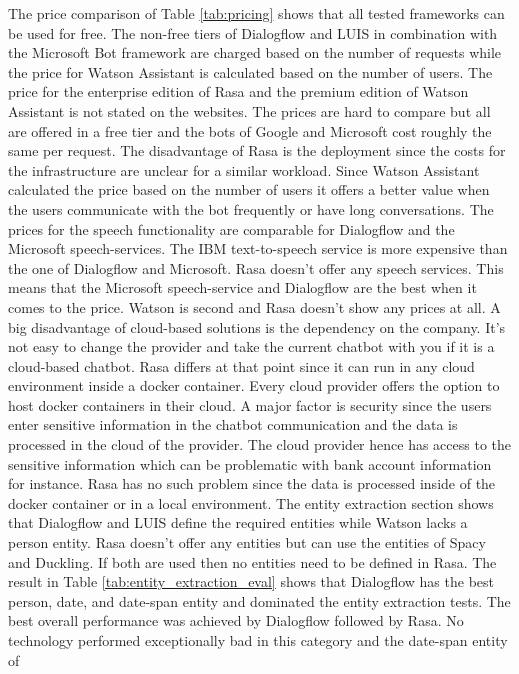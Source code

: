 The price comparison of Table \ref{tab:pricing} shows that all 
tested frameworks can be used for free.
The non-free tiers of Dialogflow and LUIS in combination with the Microsoft Bot framework 
are charged based on the number of requests while the price for Watson Assistant
is calculated based on the number of users.
The price for the enterprise edition of Rasa and the premium edition of Watson Assistant 
is not stated on the websites.
The prices are hard to compare but all are offered in a free tier and the 
bots of Google and Microsoft cost roughly the same per request. 
The disadvantage of Rasa is the deployment since the costs for the infrastructure are unclear 
for a similar workload.
Since Watson Assistant calculated the price based on the number of users it offers a better 
value when the users communicate with the bot frequently or have long conversations.
The prices for the speech functionality are comparable for Dialogflow and the Microsoft speech-services.
The IBM text-to-speech service is more expensive than the one of Dialogflow and Microsoft.
Rasa doesn't offer any speech services.
This means that the Microsoft speech-service and Dialogflow are the best when it comes to the 
price. Watson is second and Rasa doesn't show any prices at all.
A big disadvantage of cloud-based solutions is the dependency on the company.
It's not easy to change the provider and take the current chatbot with you if it 
is a cloud-based chatbot. 
Rasa differs at that point since it can run in any cloud environment inside a docker container.
Every cloud provider offers the option to host docker containers in their cloud.
A major factor is security since the users enter sensitive information in the chatbot communication
and the data is processed in the cloud of the provider.
The cloud provider hence has access to the sensitive information which can be problematic with
bank account information for instance.
Rasa has no such problem since the data is processed inside of the docker container or in a 
local environment.
The entity extraction section shows that Dialogflow and LUIS 
define the required entities while Watson lacks a person entity.
Rasa doesn't offer any entities but can use the entities of 
Spacy and Duckling.
If both are used then no entities need to be defined in Rasa.
The result in Table \ref{tab:entity_extraction_eval} shows that 
Dialogflow has the best person, date, and date-span entity and dominated the 
entity extraction tests.
The best overall performance was achieved by Dialogflow followed by Rasa.
No technology performed exceptionally bad in this category and the date-span entity of 
